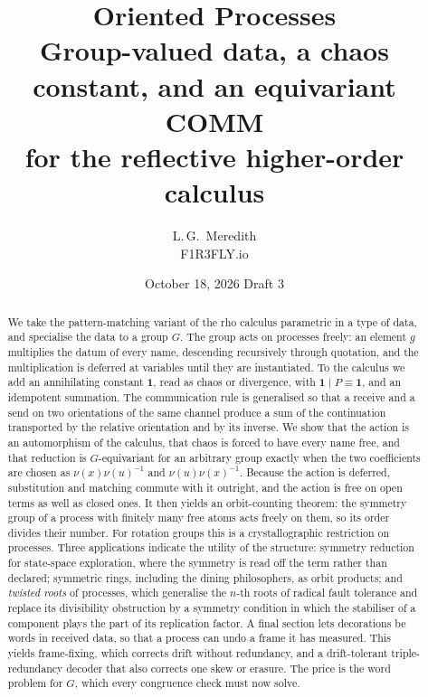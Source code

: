 \documentclass[11pt]{article}
\title{\textbf{Oriented Processes}\\[0.4em]
\large Group-valued data, a chaos constant, and an equivariant COMM\\
for the reflective higher-order calculus}
\author{L.\,G.\ Meredith\\ \small F1R3FLY.io}
\date{October 18, 2026 \quad\textendash\quad Draft 3}
\theoremstyle{definition}
\theoremstyle{remark}
\newcommand{\chaos}{\mathbf{1}}
\newcommand{\scong}{\equiv}
\begin{document}
\maketitle

\begin{abstract}
\noindent
We take the pattern-matching variant of the rho calculus parametric in a type
of data, and specialise the data to a group $G$. The group acts on processes
freely: an element $g$ multiplies the datum of every name, descending
recursively through quotation, and the multiplication is deferred at variables
until they are instantiated. To the calculus we add an annihilating constant
$\chaos$, read as chaos or divergence, with $\chaos \mid P \scong \chaos$,
and an idempotent summation. The communication rule is generalised so that
a receive and a send on two orientations of the same channel produce a sum of
the continuation transported by the relative orientation and by its inverse.
We show that the action is an automorphism of the calculus, that chaos is
forced to have every name free, and that reduction is $G$-equivariant for an
arbitrary group exactly when the two coefficients are chosen as
$\nu(x)\nu(u)^{-1}$ and $\nu(u)\nu(x)^{-1}$. Because the action is deferred,
substitution and matching commute with it outright, and the action is free on
open terms as well as closed ones. It then yields an orbit-counting theorem:
the symmetry group of a process with finitely many free atoms acts freely on
them, so its order divides their number. For
rotation groups this is a crystallographic restriction on processes. Three
applications indicate the utility of the structure: symmetry reduction for
state-space exploration, where the symmetry is read off the term rather than
declared; symmetric rings, including the dining philosophers, as orbit
products; and \emph{twisted roots} of processes, which generalise the $n$-th
roots of radical fault tolerance and replace its divisibility obstruction by a
symmetry condition in which the stabiliser of a component plays the part of
its replication factor. A final section lets decorations be words in
received data, so that a process can undo a frame it has measured. This
yields frame-fixing, which corrects drift without redundancy, and a
drift-tolerant triple-redundancy decoder that also corrects one skew or
erasure. The price is the word problem for $G$, which every congruence check
must now solve.
\end{abstract}

\tableofcontents

\end{document}
